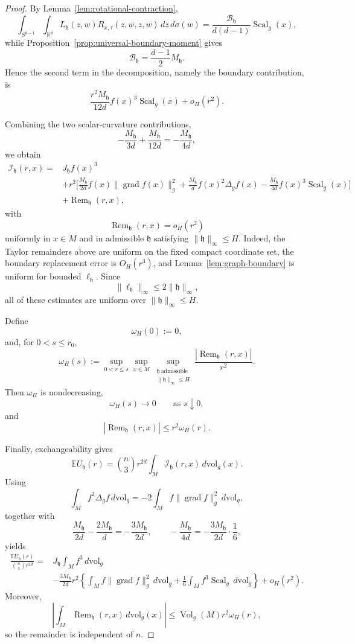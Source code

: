 \documentclass[11pt]{article}
\theoremstyle{remark}
\newcommand{\R}{\mathbb R}
\newcommand{\Vol}{\operatorname{Vol}}
\newcommand{\Scal}{\operatorname{Scal}}
\newcommand{\grad}{\operatorname{grad}}
\newcommand{\E}{\mathbb E}
\numberwithin{equation}{section}
\begin{document}
\begin{proof}
By Lemma~\ref{lem:rotational-contraction},
\[
\int_{S^{d-1}}\int_{\R^d}
L_{\mathfrak h}(z,w)
R_{x,\tau}(z,w,z,w)
\,dz\,d\sigma(w)
=
\frac{\mathcal B_{\mathfrak h}}{d(d-1)}
\Scal_g(x),
\]
while Proposition~\ref{prop:universal-boundary-moment} gives
\[
\mathcal B_{\mathfrak h}
=
\frac{d-1}{2}M_{\mathfrak h}.
\]
Hence the second term in the decomposition, namely the boundary
contribution, is
\[
\frac{r^2M_{\mathfrak h}}{12d}
f(x)^3\Scal_g(x)
+
o_H(r^2).
\]

Combining the two scalar-curvature contributions,
\[
-\frac{M_{\mathfrak h}}{3d}
+
\frac{M_{\mathfrak h}}{12d}
=
-\frac{M_{\mathfrak h}}{4d},
\]
we obtain
\[
\begin{aligned}
\mathcal I_{\mathfrak h}(r,x)
={}&
J_{\mathfrak h}f(x)^3\\
&+
r^2\Bigg[
\frac{M_{\mathfrak h}}{2d}
f(x)\|\grad f(x)\|_g^2
+
\frac{M_{\mathfrak h}}d
f(x)^2\Delta_g f(x)
-
\frac{M_{\mathfrak h}}{4d}
f(x)^3\Scal_g(x)
\Bigg]\\
&+
\operatorname{Rem}_{\mathfrak h}(r,x),
\end{aligned}
\]
with
\[
\operatorname{Rem}_{\mathfrak h}(r,x)=o_H(r^2)
\]
uniformly in \(x\in M\) and in admissible
\(\mathfrak h\) satisfying \(\|\mathfrak h\|_\infty\le H\).
Indeed, the Taylor remainders above are uniform on the fixed compact
coordinate set, the boundary replacement error is \(O_H(r^3)\), and
Lemma~\ref{lem:graph-boundary} is uniform for bounded
\(\ell_{\mathfrak h}\).  Since
\[
\|\ell_{\mathfrak h}\|_\infty
\le
2\|\mathfrak h\|_\infty,
\]
all of these estimates are uniform over
\(\|\mathfrak h\|_\infty\le H\).

Define
\[
\omega_H(0):=0,
\]
and, for \(0<s\le r_0\),
\[
\omega_H(s)
:=
\sup_{0<r\le s}
\sup_{x\in M}
\sup_{\substack{
\mathfrak h\ \mathrm{admissible}\\
\|\mathfrak h\|_\infty\le H
}}
\frac{
|\operatorname{Rem}_{\mathfrak h}(r,x)|
}{r^2}.
\]
Then \(\omega_H\) is nondecreasing,
\[
\omega_H(s)\longrightarrow0
\qquad\text{as }s\downarrow0,
\]
and
\[
|\operatorname{Rem}_{\mathfrak h}(r,x)|
\le
r^2\omega_H(r).
\]

Finally, exchangeability gives
\[
\E U_{\mathfrak h}(r)
=
\binom{n}{3}r^{2d}
\int_M
\mathcal I_{\mathfrak h}(r,x)
\,d\mathrm{vol}_g(x).
\]
Using
\[
\int_M f^2\Delta_g f\,d\mathrm{vol}_g
=
-2\int_M f\|\grad f\|_g^2\,d\mathrm{vol}_g,
\]
together with
\[
\frac{M_{\mathfrak h}}{2d}
-
\frac{2M_{\mathfrak h}}d
=
-\frac{3M_{\mathfrak h}}{2d},
\qquad
-\frac{M_{\mathfrak h}}{4d}
=
-\frac{3M_{\mathfrak h}}{2d}\cdot\frac16,
\]
yields
\[
\begin{aligned}
\frac{\E U_{\mathfrak h}(r)}
{\binom{n}{3}r^{2d}}
={}&
J_{\mathfrak h}
\int_M f^3\,d\mathrm{vol}_g\\
&-
\frac{3M_{\mathfrak h}}{2d}r^2
\left\{
\int_M f\|\grad f\|_g^2\,d\mathrm{vol}_g
+
\frac16
\int_M f^3\Scal_g\,d\mathrm{vol}_g
\right\}
+
o_H(r^2).
\end{aligned}
\]
Moreover,
\[
\left|
\int_M
\operatorname{Rem}_{\mathfrak h}(r,x)
\,d\mathrm{vol}_g(x)
\right|
\le
\Vol_g(M)r^2\omega_H(r),
\]
so the remainder is independent of \(n\).
\end{proof}
\end{document}
